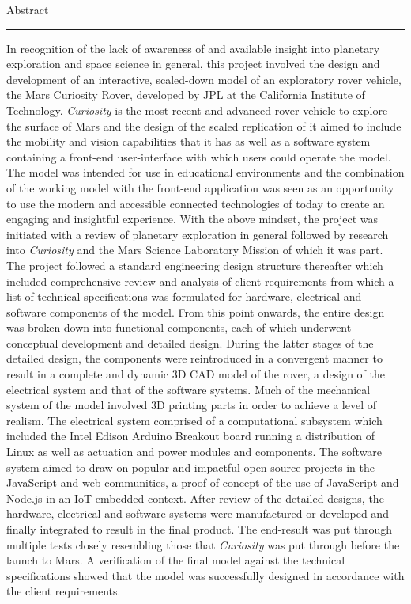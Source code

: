 {\Large Abstract}\\
\hrule

In recognition of the lack of awareness of and available insight into planetary exploration and space science in general, this project involved the design and development of an interactive, scaled-down model of an exploratory rover vehicle, the Mars Curiosity Rover, developed by JPL at the California Institute of Technology. \textit{Curiosity} is the most recent and advanced rover vehicle to explore the surface of Mars and the design of the scaled replication of it aimed to include the mobility and vision capabilities that it has as well as a software system containing a front-end user-interface with which users could operate the model. The model was intended for use in educational environments and the combination of the working model with the front-end application was seen as an opportunity to use the modern and accessible connected technologies of today to create an engaging and insightful experience. With the above mindset, the project was initiated with a review of planetary exploration in general followed by research into \textit{Curiosity} and the Mars Science Laboratory Mission of which it was part. The project followed a standard engineering design structure thereafter which included comprehensive review and analysis of client requirements from which a list of technical specifications was formulated for hardware, electrical and software components of the model. From this point onwards, the entire design was broken down into functional components, each of which underwent conceptual development and detailed design. During the latter stages of the detailed design, the components were reintroduced in a convergent manner to result in a complete and dynamic 3D CAD model of the rover, a design of the electrical system and that of the software systems. Much of the mechanical system of the model involved 3D printing parts in order to achieve a level of realism. The electrical system comprised of a computational subsystem which included the Intel Edison Arduino Breakout board running a distribution of Linux as well as actuation and power modules and components. The software system aimed to draw on popular and impactful open-source projects in the JavaScript and web communities, a proof-of-concept of the use of JavaScript and Node.js in an IoT-embedded context. After review of the detailed designs, the hardware, electrical and software systems were manufactured or developed and finally integrated to result in the final product. The end-result was put through multiple tests closely resembling those that \textit{Curiosity} was put through before the launch to Mars. A verification of the final model against the technical specifications showed that the model was successfully designed in accordance with the client requirements.